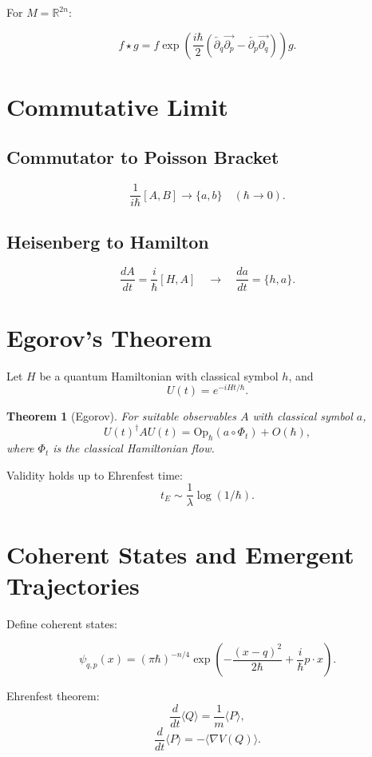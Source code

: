 \documentclass[11pt,a4paper]{article}
\newtheorem{theorem}{Theorem}
\begin{document}
For $M=\mathbb R^{2n}$:

\[
f \star g =
f \exp\!\left(
\frac{i\hbar}{2}
(\overleftarrow{\partial_q}\overrightarrow{\partial_p}
-
\overleftarrow{\partial_p}\overrightarrow{\partial_q})
\right) g.
\]

\section{Commutative Limit}

\subsection{Commutator to Poisson Bracket}

\[
\frac{1}{i\hbar}[A,B]
\longrightarrow
\{a,b\}
\quad (\hbar\to0).
\]

\subsection{Heisenberg to Hamilton}

\[
\frac{dA}{dt} = \frac{i}{\hbar}[H,A]
\quad \longrightarrow \quad
\frac{da}{dt} = \{h,a\}.
\]

\section{Egorov's Theorem}

Let $H$ be a quantum Hamiltonian with classical symbol $h$, and
\[
U(t)=e^{-iHt/\hbar}.
\]

\begin{theorem}[Egorov]
For suitable observables $A$ with classical symbol $a$,
\[
U(t)^\dagger A U(t)
=
\mathrm{Op}_\hbar(a\circ\Phi_t) + O(\hbar),
\]
where $\Phi_t$ is the classical Hamiltonian flow.
\end{theorem}

Validity holds up to Ehrenfest time:
\[
t_E \sim \frac{1}{\lambda}\log(1/\hbar).
\]

\section{Coherent States and Emergent Trajectories}

Define coherent states:

\[
\psi_{q,p}(x)
=
(\pi\hbar)^{-n/4}
\exp\!\left(
-\frac{(x-q)^2}{2\hbar}
+\frac{i}{\hbar}p\cdot x
\right).
\]

Ehrenfest theorem:
\[
\frac{d}{dt}\langle Q\rangle = \frac{1}{m}\langle P\rangle,
\]
\[
\frac{d}{dt}\langle P\rangle = -\langle \nabla V(Q)\rangle.
\]
\end{document}
